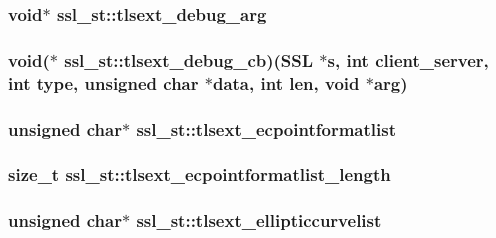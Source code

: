 \hypertarget{structssl__st_a37c9fa10121176491c8a9e5617f7be83}{
\subsubsection[{tlsext\-\_\-debug\-\_\-arg}]{\setlength{\rightskip}{0pt plus 5cm}void$\ast$ ssl\-\_\-st\-::tlsext\-\_\-debug\-\_\-arg}}\label{structssl__st_a37c9fa10121176491c8a9e5617f7be83}
\hypertarget{structssl__st_adc295a1512060b6283ef8a8b30026b16}{
\subsubsection[{tlsext\-\_\-debug\-\_\-cb}]{\setlength{\rightskip}{0pt plus 5cm}void($\ast$ ssl\-\_\-st\-::tlsext\-\_\-debug\-\_\-cb)(S\-S\-L $\ast$s, int client\-\_\-server, int {\bf type}, unsigned char $\ast$data, int len, void $\ast$arg)}}\label{structssl__st_adc295a1512060b6283ef8a8b30026b16}
\hypertarget{structssl__st_a000e3639718d5d28e610cca71c0ee995}{
\subsubsection[{tlsext\-\_\-ecpointformatlist}]{\setlength{\rightskip}{0pt plus 5cm}unsigned char$\ast$ ssl\-\_\-st\-::tlsext\-\_\-ecpointformatlist}}\label{structssl__st_a000e3639718d5d28e610cca71c0ee995}
\hypertarget{structssl__st_a1661bf580598984c531b321c0a005d37}{
\subsubsection[{tlsext\-\_\-ecpointformatlist\-\_\-length}]{\setlength{\rightskip}{0pt plus 5cm}size\-\_\-t ssl\-\_\-st\-::tlsext\-\_\-ecpointformatlist\-\_\-length}}\label{structssl__st_a1661bf580598984c531b321c0a005d37}
\hypertarget{structssl__st_af2e7ed3a280b3afb8d42ea9f9aa45637}{
\subsubsection[{tlsext\-\_\-ellipticcurvelist}]{\setlength{\rightskip}{0pt plus 5cm}unsigned char$\ast$ ssl\-\_\-st\-::tlsext\-\_\-ellipticcurvelist}}\label{structssl__st_af2e7ed3a280b3afb8d42ea9f9aa45637}
